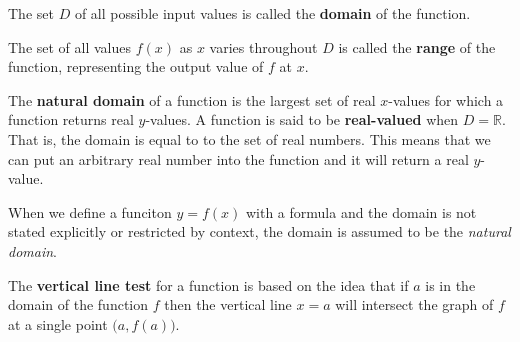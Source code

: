   The set \(D\) of all possible input values is called the \textbf{domain} of the function.

  The set of all values \(f(x)\) as \(x\) varies throughout \(D\) is called the \textbf{range} of the function, representing the output value of \(f\) at \(x\).

   The \textbf{natural domain} of a function is the largest set of real \(x\)-values for which a function returns real \(y\)-values.
  A function is said to be \textbf{real-valued} when \(D = \mathbb{R}\).
  That is, the domain is equal to to the set of real numbers.
  This means that we can put an arbitrary real number into the function and it will return a real $y$-value.

   \begin{remark}
     When we define a funciton \(y=f(x)\) with a formula and the domain is not stated explicitly or restricted by context, the domain is assumed to be the \emph{natural domain}.
   \end{remark}

  The \textbf{vertical line test} for a function is based on the idea that if \(a\) is in the domain of the function \(f\) then the vertical line \(x=a\) will intersect the graph of \(f\) at a single point \( \big(a,f(a)\big)\).

\begin{figure}[H]
  \begin{center}
  \end{center}
\end{figure}


